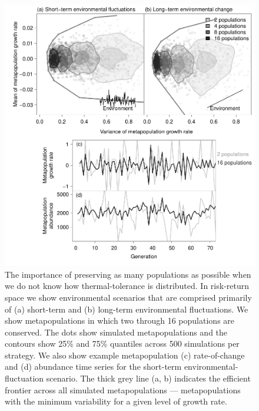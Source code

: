 \begin{figure}[htbp]
\centering
\includegraphics[width=4.5in]{metafolio/Fig5}
\caption{The importance of preserving as many populations as possible when we do not know how thermal-tolerance is distributed. In risk-return space we show environmental scenarios that are comprised primarily of (a) short-term and (b) long-term environmental fluctuations. We show metapopulations in which two through 16 populations are conserved. The dots show simulated metapopulations and the contours show 25\% and 75\% quantiles across 500 simulations per strategy. We also show example metapopulation (c) rate-of-change and (d) abundance time series for the short-term environmental-fluctuation scenario. The thick grey line (a, b) indicates the efficient frontier across all simulated metapopulations --- metapopulations with the minimum variability for a given level of growth rate.} \label{f:n}
\end{figure}

\clearpage

